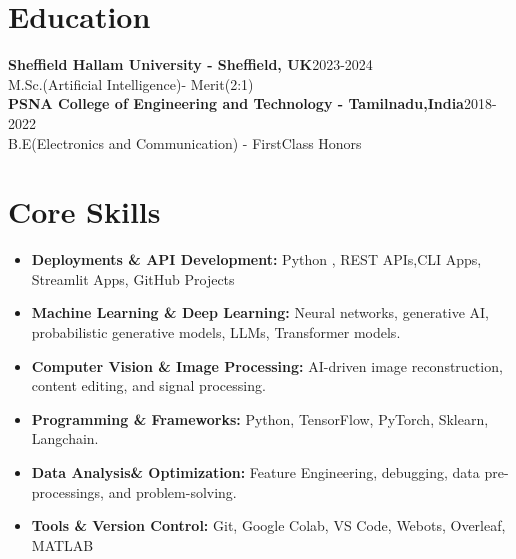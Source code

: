 \documentclass[10 pt, letterpaper]{article}
\begin{document}
\section*{Education}
\textbf{Sheffield Hallam University - Sheffield, UK}\hfill{2023-2024} \\ M.Sc.(Artificial Intelligence)- Merit(2:1)  \\

\textbf{PSNA College of Engineering and Technology - Tamilnadu,India}\hfill{2018-2022} \\B.E(Electronics and Communication) - FirstClass Honors  \\
\vspace{-0.3cm}
\section*{Core Skills}

\begin{itemize}
    \item \textbf{Deployments \& API Development:} Python , REST APIs,CLI Apps, Streamlit Apps, GitHub Projects
    \vspace{-0.23cm}
    \item \textbf{Machine Learning \& Deep Learning:} Neural networks, generative AI, probabilistic generative models, LLMs, Transformer models.
    \vspace{-0.23cm}
    \item \textbf{Computer Vision \& Image Processing:} AI-driven image reconstruction, content editing, and signal processing.
    \vspace{-0.23cm}
    \item \textbf{Programming \& Frameworks:} Python, TensorFlow, PyTorch, Sklearn, Langchain.
    \vspace{-0.23cm}
    \item \textbf{Data Analysis\& Optimization:} Feature Engineering, debugging, data pre-processings, and problem-solving.
    \item \textbf{Tools \& Version Control:} Git, Google Colab, VS Code, Webots, Overleaf, MATLAB

\end{itemize}
\end{document}
